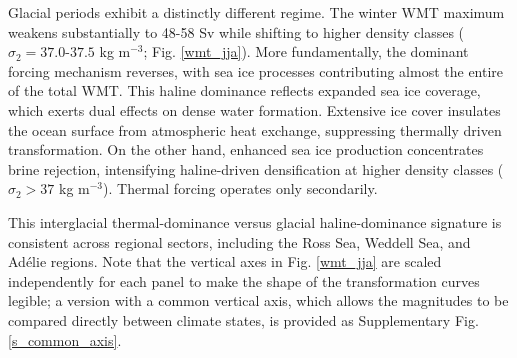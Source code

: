 \documentclass[pdflatex,sn-nature]{sn-jnl}
\begin{document}
Glacial periods exhibit a distinctly different regime. The winter WMT maximum weakens substantially to 48-58 Sv while shifting to higher density classes ($\sigma_2 = 37.0$-$37.5$ kg m$^{-3}$; Fig. \ref{wmt_jja}). More fundamentally, the dominant forcing mechanism reverses, with sea ice processes contributing almost the entire of  the total WMT. This haline dominance reflects expanded sea ice coverage, which exerts dual effects on dense water formation.  Extensive ice cover insulates the ocean surface from atmospheric heat exchange, suppressing thermally driven transformation. On the other hand, enhanced sea ice production concentrates brine rejection, intensifying haline-driven densification at higher density classes ($\sigma_2 > 37$ kg m$^{-3}$). Thermal forcing operates only secondarily.

This interglacial thermal-dominance versus glacial haline-dominance signature is consistent across regional sectors, including the Ross Sea, Weddell Sea, and Ad\'{e}lie regions. Note that the vertical axes in Fig. \ref{wmt_jja} are scaled independently for each panel to make the shape of the transformation curves legible; a version with a common vertical axis, which allows the magnitudes to be compared directly between climate states, is provided as Supplementary Fig. \ref{s_common_axis}.



\end{document}
